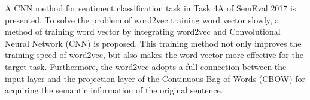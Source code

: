 A CNN method for sentiment classification task in Task 4A of SemEval 2017 is presented. To solve the problem of word2vec training word vector slowly, a method of training word vector by integrating word2vec and Convolutional Neural Network (CNN) is proposed. This training method not only improves the training speed of word2vec, but also makes the word vector more effective for the target task. Furthermore, the word2vec adopts a full connection between the input layer and the projection layer of the Continuous Bag-of-Words (CBOW) for acquiring the semantic information of the original sentence.
